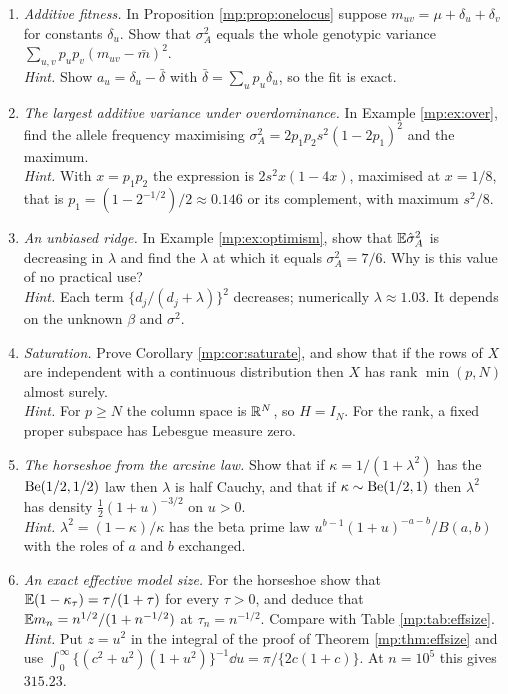 \begin{enumerate}[leftmargin=1.8em,itemsep=4pt,label=\arabic*.]
\item \emph{Additive fitness.} In Proposition \ref{mp:prop:onelocus} suppose
$m_{uv}=\mu+\delta_u+\delta_v$ for constants $\delta_u$. Show that $\sigma_A^2$ equals the
whole genotypic variance $\sum_{u,v}p_up_v(m_{uv}-\bar m)^2$.\\
\emph{Hint.} Show $a_u=\delta_u-\bar\delta$ with $\bar\delta=\sum_up_u\delta_u$, so the fit is
exact.

\item \emph{The largest additive variance under overdominance.} In Example \ref{mp:ex:over},
find the allele frequency maximising $\sigma_A^2=2p_1p_2s^2(1-2p_1)^2$ and the maximum.\\
\emph{Hint.} With $x=p_1p_2$ the expression is $2s^2x(1-4x)$, maximised at $x=1/8$, that is
$p_1=(1-2^{-1/2})/2\approx0.146$ or its complement, with maximum $s^2/8$.

\item \emph{An unbiased ridge.} In Example \ref{mp:ex:optimism}, show that
$\mathbb{E}\hat\sigma_A^2$ is decreasing in $\lambda$ and find the $\lambda$ at which it equals
$\sigma_A^2=7/6$. Why is this value of no practical use?\\
\emph{Hint.} Each term $\{d_j/(d_j+\lambda)\}^2$ decreases; numerically $\lambda\approx1.03$.
It depends on the unknown $\beta$ and $\sigma^2$.

\item \emph{Saturation.} Prove Corollary \ref{mp:cor:saturate}, and show that if the rows of
$X$ are independent with a continuous distribution then $X$ has rank $\min(p,N)$ almost
surely.\\
\emph{Hint.} For $p\ge N$ the column space is $\mathbb{R}^N$, so $H=I_N$. For the rank, a fixed
proper subspace has Lebesgue measure zero.

\item \emph{The horseshoe from the arcsine law.} Show that if $\kappa=1/(1+\lambda^2)$ has
the $\mathrm{Be}(1/2,1/2)$ law then $\lambda$ is half Cauchy, and that if $\kappa\sim\mathrm{Be}(1/2,1)$ then
$\lambda^2$ has density $\tfrac12(1+u)^{-3/2}$ on $u>0$.\\
\emph{Hint.} $\lambda^2=(1-\kappa)/\kappa$ has the beta prime law $u^{b-1}(1+u)^{-a-b}/B(a,b)$
with the roles of $a$ and $b$ exchanged.

\item \emph{An exact effective model size.} For the horseshoe show that
$\mathbb{E}(1-\kappa_\tau)=\tau/(1+\tau)$ for every $\tau>0$, and deduce that
$\mathbb{E} m_n=n^{1/2}/(1+n^{-1/2})$ at $\tau_n=n^{-1/2}$. Compare with Table \ref{mp:tab:effsize}.\\
\emph{Hint.} Put $z=u^2$ in the integral of the proof of Theorem \ref{mp:thm:effsize} and use
$\int_0^\infty\{(c^2+u^2)(1+u^2)\}^{-1}\dd u=\pi/\{2c(1+c)\}$. At $n=10^5$ this gives
$315.23$.


\end{enumerate}
